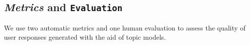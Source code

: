 
%

\subsection{\textit{Metrics} and \texttt{Evaluation}}

We use two automatic metrics and one human evaluation to assess the
quality of user responses generated with the aid of topic models.
%
%
%
%
%

